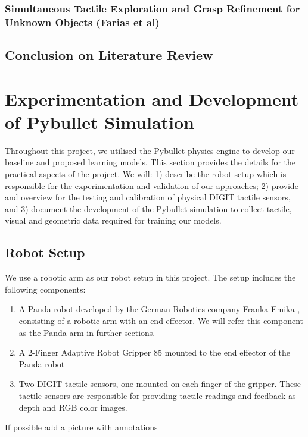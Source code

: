 \documentclass[12pt, a4paper]{report}
\theoremstyle{definition}
\begin{document}
\subsection{Simultaneous Tactile Exploration and Grasp Refinement for Unknown Objects (Farias et al)\cite{farias}}
\label{sec:2.3.3}


\section{Conclusion on Literature Review}
\label{sec:2.4}


\chapter{Experimentation and Development of Pybullet Simulation}
\label{chap:3}
Throughout this project, we utilised the Pybullet \cite{pybullet} physics engine to develop our baseline and proposed learning models. This section provides the details for the practical aspects of the project. We will: 1) describe the robot setup which is responsible for the experimentation and validation of our approaches; 2) provide and overview for the testing and calibration of physical DIGIT \cite{digit} tactile sensors, and 3) document the development of the Pybullet simulation to collect tactile, visual and geometric data required for training our models.

\section{Robot Setup}
\label{sec:3.1}
We use a robotic arm as our robot setup in this project. The setup includes the following components:
\begin{enumerate}
    \item A Panda robot developed by the German Robotics company Franka Emika \cite{franka}, consisting of a robotic arm with an end effector. We will refer this component as the Panda arm in further sections.
    \item A 2-Finger Adaptive Robot Gripper 85 \cite{robotiq} mounted to the end effector of the Panda robot
    \item Two DIGIT \cite{digit} tactile sensors, one mounted on each finger of the gripper. These tactile sensors are responsible for providing tactile readings and feedback as depth and RGB color images.
\end{enumerate}
{\color{red}If possible add a picture with annotations}
\end{document}
